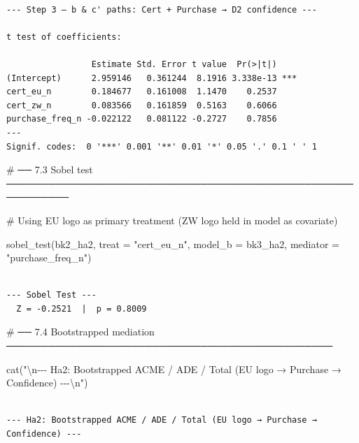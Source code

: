 \documentclass[
  letterpaper,
  DIV=11,
  numbers=noendperiod]{scrartcl}
\newenvironment{Shaded}{\begin{snugshade}}{\end{snugshade}}
\newcommand{\AttributeTok}[1]{\textcolor[rgb]{0.40,0.45,0.13}{#1}}
\newcommand{\CommentTok}[1]{\textcolor[rgb]{0.37,0.37,0.37}{#1}}
\newcommand{\FunctionTok}[1]{\textcolor[rgb]{0.28,0.35,0.67}{#1}}
\newcommand{\NormalTok}[1]{\textcolor[rgb]{0.00,0.23,0.31}{#1}}
\newcommand{\SpecialCharTok}[1]{\textcolor[rgb]{0.37,0.37,0.37}{#1}}
\newcommand{\StringTok}[1]{\textcolor[rgb]{0.13,0.47,0.30}{#1}}
\begin{document}
\begin{verbatim}

--- Step 3 – b & c' paths: Cert + Purchase → D2 confidence ---

t test of coefficients:

                 Estimate Std. Error t value  Pr(>|t|)    
(Intercept)      2.959146   0.361244  8.1916 3.338e-13 ***
cert_eu_n        0.184677   0.161008  1.1470    0.2537    
cert_zw_n        0.083566   0.161859  0.5163    0.6066    
purchase_freq_n -0.022122   0.081122 -0.2727    0.7856    
---
Signif. codes:  0 '***' 0.001 '**' 0.01 '*' 0.05 '.' 0.1 ' ' 1
\end{verbatim}

\begin{Shaded}
\begin{Highlighting}[]
\CommentTok{\# ── 7.3  Sobel test ───────────────────────────────────────────────────────────}

\CommentTok{\# Using EU logo as primary treatment (ZW logo held in model as covariate)}

\FunctionTok{sobel\_test}\NormalTok{(bk2\_ha2, }\AttributeTok{treat =} \StringTok{"cert\_eu\_n"}\NormalTok{, }\AttributeTok{model\_b =}\NormalTok{ bk3\_ha2, }\AttributeTok{mediator =} \StringTok{"purchase\_freq\_n"}\NormalTok{)}
\end{Highlighting}
\end{Shaded}

\begin{verbatim}

--- Sobel Test ---
  Z = -0.2521  |  p = 0.8009
\end{verbatim}

\begin{Shaded}
\begin{Highlighting}[]
\CommentTok{\# ── 7.4  Bootstrapped mediation ───────────────────────────────────────────────}

\FunctionTok{cat}\NormalTok{(}\StringTok{"}\SpecialCharTok{\textbackslash{}n}\StringTok{{-}{-}{-} Ha2: Bootstrapped ACME / ADE / Total (EU logo → Purchase → Confidence) {-}{-}{-}}\SpecialCharTok{\textbackslash{}n}\StringTok{"}\NormalTok{)}
\end{Highlighting}
\end{Shaded}

\begin{verbatim}

--- Ha2: Bootstrapped ACME / ADE / Total (EU logo → Purchase → Confidence) ---
\end{verbatim}
\end{document}
